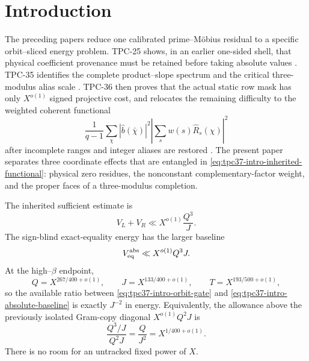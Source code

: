 \section{Introduction}
\label{sec:tpc37-introduction}

The preceding papers reduce one calibrated prime--M\"obius residual to a
specific orbit--sliced energy problem.  TPC-25 shows, in an earlier
one-sided shell, that physical coefficient provenance must be retained
before taking absolute values \citep{WangTPC25}.  TPC-35 identifies the
complete product--slope spectrum and the critical three-modulus alias
scale \citep{WangTPC35}.  TPC-36 then proves that the actual static row
mask has only $X^{o(1)}$ signed projective cost, and relocates the
remaining difficulty to the weighted coherent functional
\begin{equation}
 \frac1{q-1}\sum_\chi
 |\widehat b(\bar\chi)|^2
 \left|\sum_s w(s)\widehat R_s(\chi)\right|^2
 \label{eq:tpc37-intro-inherited-functional}
\end{equation}
after incomplete ranges and integer aliases are restored
\citep{WangTPC36}.  The present paper separates three coordinate effects
that are entangled in \eqref{eq:tpc37-intro-inherited-functional}:
physical zero residues, the nonconstant complementary-factor weight, and
the proper faces of a three-modulus completion.

The inherited sufficient estimate is
\begin{equation}
 \boxed{
 V_L+V_R\ll X^{o(1)}\frac{Q^3}{J}.}
 \label{eq:tpc37-intro-orbit-gate}
\end{equation}
The sign-blind exact-equality energy has the larger baseline
\begin{equation}
 V_{\rm eq}^{\rm abs}\ll X^{o(1)}Q^3J.
 \label{eq:tpc37-intro-absolute-baseline}
\end{equation}
At the high--\(\beta\) endpoint,
\begin{equation}
 Q=X^{267/400+o(1)},\qquad
 J=X^{133/400+o(1)},\qquad
 T=X^{193/500+o(1)},
 \label{eq:tpc37-intro-scales}
\end{equation}
so the available ratio between
\eqref{eq:tpc37-intro-orbit-gate} and
\eqref{eq:tpc37-intro-absolute-baseline} is exactly $J^{-2}$ in
energy.  Equivalently, the allowance above the previously isolated
Gram-copy diagonal $X^{o(1)}Q^2J$ is
\begin{equation}
 \frac{Q^3/J}{Q^2J}
 =\frac Q{J^2}=X^{1/400+o(1)}.
 \label{eq:tpc37-intro-margin}
\end{equation}
There is no room for an untracked fixed power of $X$.

